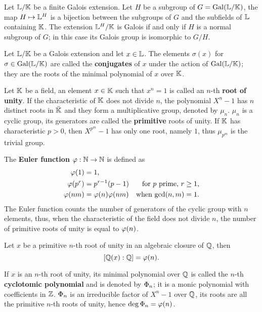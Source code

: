 \begin{theorem}
  Let $\mathbb{L}/\mathbb{K}$ be a finite Galois extension. Let $H$ be a subgroup of
  $G=\operatorname{Gal}(\mathbb{L}/\mathbb{K})$, the map $H\mapsto \mathbb{L}^H$ is a bijection between
  the subgroups of $G$ and the subfields of $\mathbb{L}$ containing $\mathbb{K}$. The
  extension $\mathbb{L}^H/\mathbb{K}$ is Galois if and only if $H$ is a normal
  subgroup of $G$; in this case its Galois group is isomorphic to
  $G/H$.
\end{theorem}

Let $\mathbb{L}/\mathbb{K}$ be a Galois extension and let $x\in\mathbb{L}$. The elements
$\sigma(x)$ for $\sigma\in\operatorname{Gal}(\mathbb{L}/\mathbb{K})$ are called the
\textbf{conjugates} of $x$ under the action
of $\operatorname{Gal}(\mathbb{L}/\mathbb{K})$; they are the roots of the minimal polynomial of $x$
over $\mathbb{K}$.

Let $\mathbb{K}$ be a field, an element $x\in \mathbb{K}$ such that $x^n=1$ is called
an $n$-th \textbf{root of unity}. If the
characteristic of $\mathbb{K}$ does not divide $n$, the polynomial $X^n-1$ has
$n$ distinct roots in $\bar{\mathbb{K}}$ and they form a multiplicative
group, denoted by $\mu_n$. $\mu_n$ is a cyclic group, its generators
are called the  \textbf{primitive}
roots of unity.  If $\mathbb{K}$ has characteristic $p>0$, then $X^{p^m}-1$
has only one root, namely $1$, thus $\mu_{p^m}$ is the trivial group.

The \textbf{Euler function}
$\varphi:\mathbb{N}\rightarrow\mathbb{N}$ is
defined as
\begin{align*}
  \varphi(1) &= 1\text{,}\\
  \varphi(p^r) &= p^{r-1}(p-1) &\text{for $p$ prime, $r\ge1$,}\\
  \varphi(nm) &= \varphi(n)\varphi(nm) &\text{when $\gcd(n,m)=1$.}
\end{align*}
The Euler function counts the number of generators of the cyclic group
with $n$ elements, thus, when the characteristic of the field does not
divide $n$, the number of primitive roots of unity is equal to $\varphi(n)$.

\begin{theorem}
  Let $x$ be a primitive $n$-th root of unity in an algebraic closure
  of $\mathbb{Q}$, then
  \[[\mathbb{Q}(x):\mathbb{Q}]=\varphi(n)\text{.}\]
\end{theorem}

If $x$ is an $n$-th root of unity, its minimal polynomial over $\mathbb{Q}$ is
called the $n$-th \textbf{cyclotomic
  polynomial} and is denoted by
$\Phi_n$; it
is a monic polynomial with coefficients in $\mathbb{Z}$. $\Phi_n$ is an
irreducible factor of $X^n-1$ over $\mathbb{Q}$, its roots are all the
primitive $n$-th roots of unity, hence $\deg\Phi_n=\varphi(n)$.

